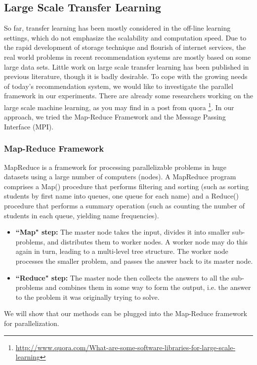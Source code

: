 \subsection{Large Scale Transfer Learning}
So far, transfer learning has been mostly considered in the off-line learning settings, which do not emphasize the scalability and computation speed. Due to the rapid development of storage technique and flourish of internet services, the real world problems in recent recommendation systems are mostly based on some large data sets. Little work on large scale transfer learning has been published in previous literature, though it is badly desirable. To cope with the growing needs of today's recommendation system, we would like to investigate the parallel framework in our experiments. There are already some researchers working on the large scale machine learning, as you may find in a post from quora \footnote{\url{http://www.quora.com/What-are-some-software-libraries-for-large-scale-learning}}. In our approach, we tried the Map-Reduce Framework and the Message Passing Interface (MPI).

\hspace{0.02in}
\subsubsection{Map-Reduce Framework}
MapReduce is a framework for processing parallelizable problems in huge datasets using a large number of computers (nodes). A MapReduce program comprises a Map() procedure that performs filtering and sorting (such as sorting students by first name into queues, one queue for each name) and a Reduce() procedure that performs a summary operation (such as counting the number of students in each queue, yielding name frequencies).
\begin{itemize}
\item {\bf ``Map" step:} The master node takes the input, divides it into smaller sub-problems, and distributes them to worker nodes. A worker node may do this again in turn, leading to a multi-level tree structure. The worker node processes the smaller problem, and passes the answer back to its master node.
\item {\bf ``Reduce" step:} The master node then collects the answers to all the sub-problems and combines them in some way to form the output, i.e. the answer to the problem it was originally trying to solve.
\end{itemize}
We will show that our methods can be plugged into the Map-Reduce framework for parallelization.

